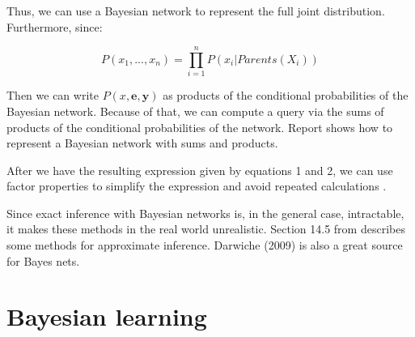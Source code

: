 \documentclass[a4paper,10pt]{article}
\theoremstyle{plain}
\begin{document}
Thus, we can use a Bayesian network to represent the full joint distribution. Furthermore, since:

\begin{equation}
  P(x_1,...,x_n) = \prod_{i=1}^n P(x_i|Parents(X_i))
\end{equation}

Then we can write $P(x,\mathbf{e},\mathbf{y})$ as products of the conditional probabilities of the
Bayesian network. Because of that, we can compute a query via the sums of products of the
conditional probabilities of the network. Report \cite{report-1} shows how to represent a Bayesian
network with sums and products.

After we have the resulting expression given by equations 1 and 2, we can use factor properties
\cite{report-2} to simplify the expression and avoid repeated calculations \cite{report-5}.

Since exact inference with Bayesian networks is, in the general case, intractable, it makes these
methods in the real world unrealistic. Section 14.5 from \cite{aima} describes some methods for
approximate inference. Darwiche (2009)\cite{bayes-net-darwiche} is also a great source for Bayes
nets.

\section{Bayesian learning}



\newpage

\printbibliography
\end{document}
